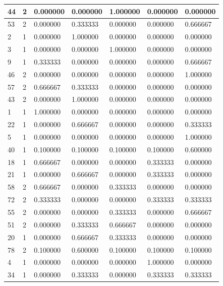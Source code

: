 \documentclass[materials,article,submit,pdftex,moreauthors]{Definitions/mdpi}
\begin{document}
\begin{table}[H]
\begin{scriptsize}
\begin{minipage}{0.40\linewidth}
{\begin{tabularx}{\linewidth}{@{} |l|l|l|l|l|l|l|}
        44 & 2 & 0.000000 & 0.000000 & 1.000000 & 0.000000 & 0.000000 \\ \hline
        53 & 2 & 0.000000 & 0.333333 & 0.000000 & 0.000000 & 0.666667 \\ \hline
        2 & 1 & 0.000000 & 1.000000 & 0.000000 & 0.000000 & 0.000000 \\ \hline
        3 & 1 & 0.000000 & 0.000000 & 1.000000 & 0.000000 & 0.000000 \\ \hline
        9 & 1 & 0.333333 & 0.000000 & 0.000000 & 0.000000 & 0.666667 \\ \hline
        46 & 2 & 0.000000 & 0.000000 & 0.000000 & 0.000000 & 1.000000 \\ \hline
        57 & 2 & 0.666667 & 0.333333 & 0.000000 & 0.000000 & 0.000000 \\ \hline
        43 & 2 & 0.000000 & 1.000000 & 0.000000 & 0.000000 & 0.000000 \\ \hline
        1 & 1 & 1.000000 & 0.000000 & 0.000000 & 0.000000 & 0.000000 \\ \hline
        22 & 1 & 0.000000 & 0.666667 & 0.000000 & 0.000000 & 0.333333 \\ \hline
        5 & 1 & 0.000000 & 0.000000 & 0.000000 & 0.000000 & 1.000000 \\ \hline
        40 & 1 & 0.100000 & 0.100000 & 0.100000 & 0.100000 & 0.600000 \\ \hline
        18 & 1 & 0.666667 & 0.000000 & 0.000000 & 0.333333 & 0.000000 \\ \hline
        21 & 1 & 0.000000 & 0.666667 & 0.000000 & 0.333333 & 0.000000 \\ \hline
        58 & 2 & 0.666667 & 0.000000 & 0.333333 & 0.000000 & 0.000000 \\ \hline
        72 & 2 & 0.333333 & 0.000000 & 0.000000 & 0.333333 & 0.333333 \\ \hline
        55 & 2 & 0.000000 & 0.000000 & 0.333333 & 0.000000 & 0.666667 \\ \hline
        51 & 2 & 0.000000 & 0.333333 & 0.666667 & 0.000000 & 0.000000 \\ \hline
        20 & 1 & 0.000000 & 0.666667 & 0.333333 & 0.000000 & 0.000000 \\ \hline
        78 & 2 & 0.100000 & 0.600000 & 0.100000 & 0.100000 & 0.100000 \\ \hline
        4 & 1 & 0.000000 & 0.000000 & 0.000000 & 1.000000 & 0.000000 \\ \hline
        34 & 1 & 0.000000 & 0.333333 & 0.000000 & 0.333333 & 0.333333 \\ \hline

\end{tabularx}}
\end{minipage}
\end{scriptsize}
\end{table}
\end{document}
